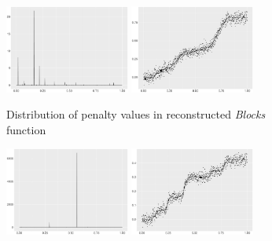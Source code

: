 \begin{figure}
    \centering
    \begin{subfigure}{\textwidth}
    \centering
    \includegraphics[width=0.45\textwidth]{Chapters/02TractorSplineTheory/plot/ggplot/ggBlocksPenaltyBar.pdf}
    \includegraphics[width=0.45\textwidth]{Chapters/02TractorSplineTheory/plot/ggplot/ggBlocksPenaltyLine.pdf}
    \caption{Distribution of penalty values in reconstructed \textit{Blocks} function}
    \end{subfigure}
    \begin{subfigure}{\textwidth}
    \centering
    \includegraphics[width=0.45\textwidth]{Chapters/02TractorSplineTheory/plot/ggplot/ggBumpsPenaltyBar.pdf}
    \includegraphics[width=0.45\textwidth]{Chapters/02TractorSplineTheory/plot/ggplot/ggBumpsPenaltyLine.pdf}

\end{subfigure}
\end{figure}
